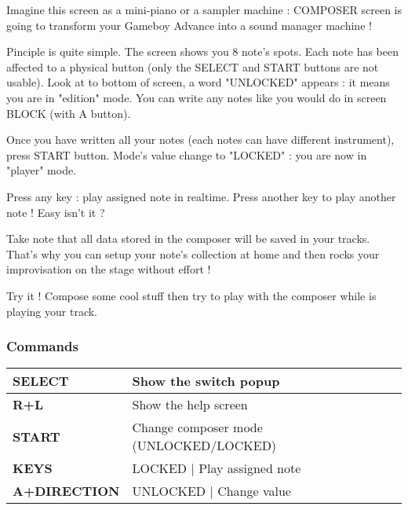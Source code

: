 Imagine this screen as a mini-piano or a sampler machine : COMPOSER screen is going to transform your Gameboy Advance into a sound manager machine !


Pinciple is quite simple.
The screen shows you 8 note's spots.
Each note has been affected to a physical button (only the SELECT and START buttons are not usable).
Look at to bottom of screen, a word "UNLOCKED" appears :
    it means you are in "edition" mode. You can write any notes like you would do in screen BLOCK (with A button).
\medskip

Once you have written all your notes (each notes can have different instrument), press START button.
Mode's value change to "LOCKED" : you are now in "player" mode.
\medskip

Press any key : \FAT play assigned note in realtime.
Press another key to play another note ! Easy isn't it ?
\medskip

Take note that all data stored in the composer will be saved in your tracks.
That's why you can setup your note's collection at home and then rocks your improvisation on the stage without effort !
\medskip

Try it ! Compose some cool stuff then try to play with the composer while \FAT is playing your track.
\medskip

\subsubsection{Commands}

\tablelasttail{\hline}
\begin{supertabular}{|l|p{11cm}|}
    {\bf SELECT} & Show the switch popup \\
    \hline
    {\bf R+L} & Show the help screen \\
    \hline
    {\bf START} & Change composer mode (UNLOCKED/LOCKED) \\
    \hline
    {\bf KEYS} & LOCKED | Play assigned note \\
    \hline
    {\bf A+DIRECTION} & UNLOCKED | Change value \\
\end{supertabular}


